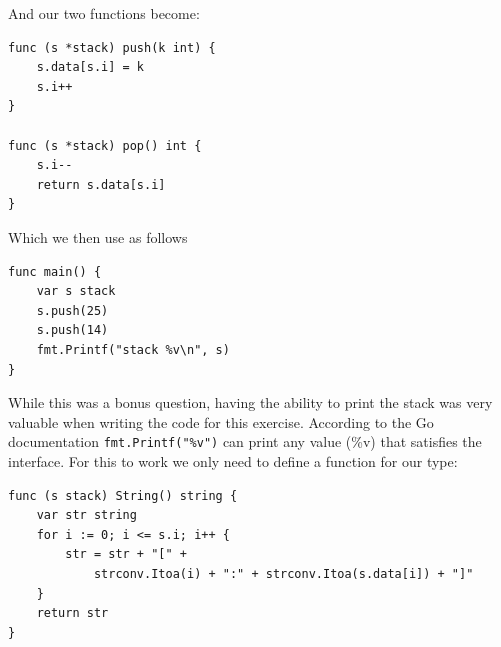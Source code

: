 \begin{Answer}
\noindent{}And our two functions become:
\begin{lstlisting}
func (s *stack) push(k int) {
	s.data[s.i] = k
	s.i++
}

func (s *stack) pop() int {
	s.i--
	return s.data[s.i]
}
\end{lstlisting}
Which we then use as follows
\begin{lstlisting}
func main() {
	var s stack
	s.push(25)
	s.push(14)
	fmt.Printf("stack %v\n", s)
}
\end{lstlisting}

\Question While this was a bonus question, having the ability to print
the stack was very valuable when writing the code for this exercise.
According to the Go documentation \lstinline{fmt.Printf("%v")} can
print any value (\%v) that satisfies the  interface.
For this to work we only need to define a  function for
our type:
\begin{lstlisting}[caption=stack.String()]
func (s stack) String() string {
	var str string
	for i := 0; i <= s.i; i++ {
		str = str + "[" +
			strconv.Itoa(i) + ":" + strconv.Itoa(s.data[i]) + "]"
	}
	return str
}
\end{lstlisting}
\end{Answer}
